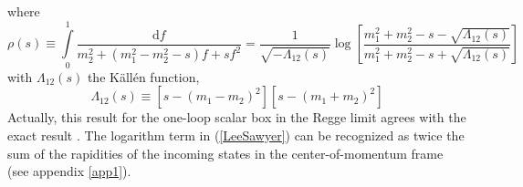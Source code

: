 where
\begin{equation}
	\rho(s) \equiv \int\limits_{0}^{1} \frac{\mathrm{d}f}{m_{2}^{2} + (m_{1}^{2} - m_{2}^{2} - s)f + s f^{2}} = \frac{1}{\sqrt{-\Lambda_{12}(s)}} \log{\left[ \frac{m_{1}^{2} + m_{2}^{2} - s - \sqrt{\Lambda_{12}(s)}}{m_{1}^{2} + m_{2}^{2} - s + \sqrt{\Lambda_{12}(s)}} \right]} \label{LeeSawyer}
\end{equation}
with $\Lambda_{12}(s)$ the K\"{a}ll\'{e}n function,
\begin{equation}
	\Lambda_{12}(s) \equiv [s - (m_{1} - m_{2})^{2}][s - (m_{1} + m_{2})^{2}]
\end{equation}
Actually, this result for the one-loop scalar box in the Regge limit agrees with the exact result \cite{PvN,tHVelt}. The logarithm term in (\ref{LeeSawyer}) can be recognized as twice the sum of the rapidities of the incoming states in the center-of-momentum frame (see appendix \ref{app1}).

